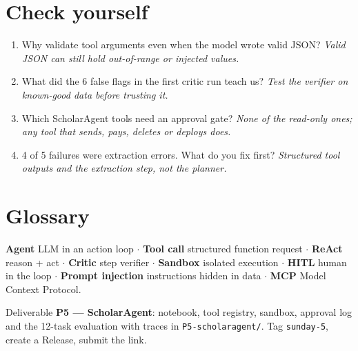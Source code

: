 \documentclass[11pt,a4paper]{article}
\begin{document}
\section*{Check yourself}
\begin{enumerate}
\item Why validate tool arguments even when the model wrote valid JSON? \emph{Valid JSON can still hold out-of-range or injected values.}
\item What did the 6 false flags in the first critic run teach us? \emph{Test the verifier on known-good data before trusting it.}
\item Which ScholarAgent tools need an approval gate? \emph{None of the read-only ones; any tool that sends, pays, deletes or deploys does.}
\item 4 of 5 failures were extraction errors. What do you fix first? \emph{Structured tool outputs and the extraction step, not the planner.}
\end{enumerate}

\section*{Glossary}
\textbf{Agent} LLM in an action loop $\cdot$ \textbf{Tool call} structured function request $\cdot$ \textbf{ReAct} reason + act $\cdot$ \textbf{Critic} step verifier $\cdot$ \textbf{Sandbox} isolated execution $\cdot$ \textbf{HITL} human in the loop $\cdot$ \textbf{Prompt injection} instructions hidden in data $\cdot$ \textbf{MCP} Model Context Protocol.

\begin{submitbox}
Deliverable \textbf{P5 --- ScholarAgent}: notebook, tool registry, sandbox, approval log and the 12-task evaluation with traces in \texttt{P5-scholaragent/}. Tag \texttt{sunday-5}, create a Release, submit the link.
\end{submitbox}


\end{document}
